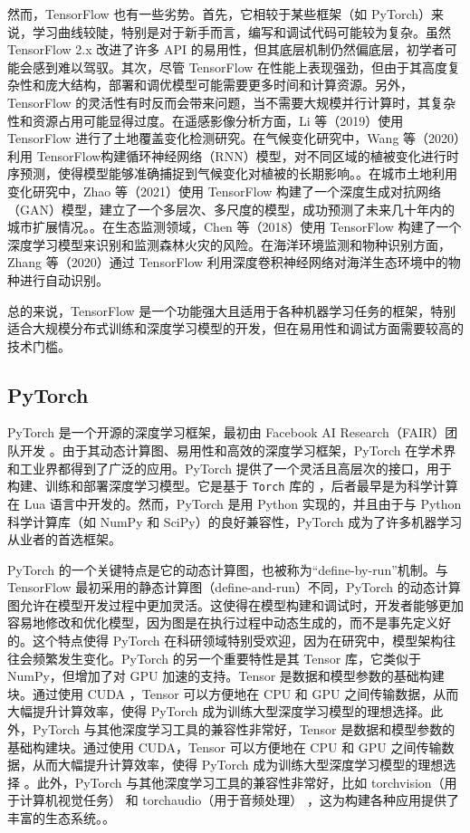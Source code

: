 \documentclass[AutoFakeBold]{LZUThesis-PgD&PhD}
\begin{document}
	然而，TensorFlow 也有一些劣势。首先，它相较于某些框架（如 PyTorch）来说，学习曲线较陡，特别是对于新手而言，编写和调试代码可能较为复杂。虽然 TensorFlow 2.x 改进了许多 API 的易用性，但其底层机制仍然偏底层，初学者可能会感到难以驾驭。其次，尽管 TensorFlow 在性能上表现强劲，但由于其高度复杂性和庞大结构，部署和调优模型可能需要更多时间和计算资源。另外，TensorFlow 的灵活性有时反而会带来问题，当不需要大规模并行计算时，其复杂性和资源占用可能显得过度。在遥感影像分析方面，Li 等（2019）使用 TensorFlow 进行了土地覆盖变化检测研究\cite{li2019}。在气候变化研究中，Wang 等（2020）利用 TensorFlow构建循环神经网络（RNN）模型，对不同区域的植被变化进行时序预测，使得模型能够准确捕捉到气候变化对植被的长期影响。\cite{wang2020H}。在城市土地利用变化研究中，Zhao 等（2021）使用 TensorFlow 构建了一个深度生成对抗网络（GAN）模型，建立了一个多层次、多尺度的模型，成功预测了未来几十年内的城市扩展情况。\cite{zhao2021}。在生态监测领域，Chen 等（2018）使用 TensorFlow 构建了一个深度学习模型来识别和监测森林火灾的风险\cite{chen2018}。在海洋环境监测和物种识别方面，Zhang 等（2020）通过 TensorFlow 利用深度卷积神经网络对海洋生态环境中的物种进行自动识别\cite{zhang2020}。
	
	总的来说，TensorFlow 是一个功能强大且适用于各种机器学习任务的框架，特别适合大规模分布式训练和深度学习模型的开发，但在易用性和调试方面需要较高的技术门槛。

	\subsection{PyTorch}
	
	PyTorch 是一个开源的深度学习框架，最初由 Facebook AI Research（FAIR）团队开发 \cite{paszke2019pytorch}。由于其动态计算图、易用性和高效的深度学习框架，PyTorch 在学术界和工业界都得到了广泛的应用。PyTorch 提供了一个灵活且高层次的接口，用于构建、训练和部署深度学习模型。它是基于 \texttt{Torch} 库的 \cite{torch}，后者最早是为科学计算在 Lua 语言中开发的。然而，PyTorch 是用 Python 实现的，并且由于与 Python 科学计算库（如 NumPy 和 SciPy）的良好兼容性，PyTorch 成为了许多机器学习从业者的首选框架。
	
	PyTorch 的一个关键特点是它的动态计算图，也被称为“define-by-run”机制。与 TensorFlow 最初采用的静态计算图（define-and-run）不同，PyTorch 的动态计算图允许在模型开发过程中更加灵活。这使得在模型构建和调试时，开发者能够更加容易地修改和优化模型，因为图是在执行过程中动态生成的，而不是事先定义好的。这个特点使得 PyTorch 在科研领域特别受欢迎，因为在研究中，模型架构往往会频繁发生变化。PyTorch 的另一个重要特性是其 Tensor 库，它类似于 NumPy，但增加了对 GPU 加速的支持。Tensor 是数据和模型参数的基础构建块。通过使用 CUDA \cite{cuda}，Tensor 可以方便地在 CPU 和 GPU 之间传输数据，从而大幅提升计算效率，使得 PyTorch 成为训练大型深度学习模型的理想选择。此外，PyTorch 与其他深度学习工具的兼容性非常好，Tensor 是数据和模型参数的基础构建块。通过使用 CUDA，Tensor 可以方便地在 CPU 和 GPU 之间传输数据，从而大幅提升计算效率，使得 PyTorch 成为训练大型深度学习模型的理想选择 \cite{pytorch}。此外，PyTorch 与其他深度学习工具的兼容性非常好，比如 torchvision（用于计算机视觉任务） \cite{torchvision} 和 torchaudio（用于音频处理） \cite{torchaudio}，这为构建各种应用提供了丰富的生态系统。。
	
\end{document}
